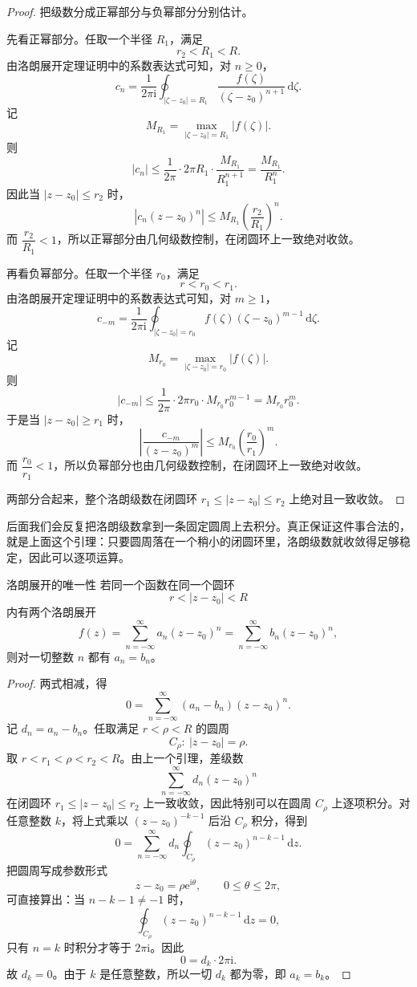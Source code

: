 \begin{proof}
把级数分成正幂部分与负幂部分分别估计。

先看正幂部分。任取一个半径 $R_1$，满足
\[
    r_2<R_1<R.
\]
由洛朗展开定理证明中的系数表达式可知，对 $n\ge 0$，
\[
    c_n=
    \frac{1}{2\pi\mathrm{i}}
    \oint_{|\zeta-z_0|=R_1}
    \frac{f(\zeta)}{(\zeta-z_0)^{n+1}}\,\mathrm{d}\zeta.
\]
记
\[
    M_{R_1}=\max_{|\zeta-z_0|=R_1}|f(\zeta)|.
\]
则
\[
    |c_n|
    \le \frac{1}{2\pi}\cdot 2\pi R_1\cdot \frac{M_{R_1}}{R_1^{n+1}}
    = \frac{M_{R_1}}{R_1^n}.
\]
因此当 $|z-z_0|\le r_2$ 时，
\[
    |c_n(z-z_0)^n|
    \le M_{R_1}\left(\frac{r_2}{R_1}\right)^n.
\]
而 $\dfrac{r_2}{R_1}<1$，所以正幂部分由几何级数控制，在闭圆环上一致绝对收敛。

再看负幂部分。任取一个半径 $r_0$，满足
\[
    r<r_0<r_1.
\]
由洛朗展开定理证明中的系数表达式可知，对 $m\ge 1$，
\[
    c_{-m}
    =
    \frac{1}{2\pi\mathrm{i}}
    \oint_{|\zeta-z_0|=r_0}
    f(\zeta)(\zeta-z_0)^{m-1}\,\mathrm{d}\zeta.
\]
记
\[
    M_{r_0}=\max_{|\zeta-z_0|=r_0}|f(\zeta)|.
\]
则
\[
    |c_{-m}|
    \le \frac{1}{2\pi}\cdot 2\pi r_0\cdot M_{r_0} r_0^{m-1}
    = M_{r_0}r_0^m.
\]
于是当 $|z-z_0|\ge r_1$ 时，
\[
    \left|\frac{c_{-m}}{(z-z_0)^m}\right|
    \le M_{r_0}\left(\frac{r_0}{r_1}\right)^m.
\]
而 $\dfrac{r_0}{r_1}<1$，所以负幂部分也由几何级数控制，在闭圆环上一致绝对收敛。

两部分合起来，整个洛朗级数在闭圆环 $r_1\le |z-z_0|\le r_2$ 上绝对且一致收敛。
\end{proof}

\begin{tishi}[为什么这个引理很值钱]
后面我们会反复把洛朗级数拿到一条固定圆周上去积分。真正保证这件事合法的，就是上面这个引理：只要圆周落在一个稍小的闭圆环里，洛朗级数就收敛得足够稳定，因此可以逐项运算。
\end{tishi}

\begin{dingli}{洛朗展开的唯一性}{}
若同一个函数在同一个圆环
\[
    r<|z-z_0|<R
\]
内有两个洛朗展开
\[
    f(z)=\sum_{n=-\infty}^{\infty} a_n (z-z_0)^n
    =\sum_{n=-\infty}^{\infty} b_n (z-z_0)^n,
\]
则对一切整数 $n$ 都有 $a_n=b_n$。
\end{dingli}

\begin{proof}
两式相减，得
\[
    0=\sum_{n=-\infty}^{\infty} (a_n-b_n)(z-z_0)^n.
\]
记 $d_n=a_n-b_n$。任取满足 $r<\rho<R$ 的圆周
\[
    C_\rho:\ |z-z_0|=\rho.
\]
取 $r<r_1<\rho<r_2<R$。由上一个引理，差级数
\[
    \sum_{n=-\infty}^{\infty} d_n (z-z_0)^n
\]
在闭圆环 $r_1\le |z-z_0|\le r_2$ 上一致收敛，因此特别可以在圆周 $C_\rho$ 上逐项积分。对任意整数 $k$，将上式乘以 $(z-z_0)^{-k-1}$ 后沿 $C_\rho$ 积分，得到
\[
    0=\sum_{n=-\infty}^{\infty} d_n
    \oint_{C_\rho}(z-z_0)^{n-k-1}\,\mathrm{d}z.
\]
把圆周写成参数形式
\[
    z-z_0=\rho \mathrm{e}^{\mathrm{i}\theta},\qquad 0\le \theta\le 2\pi,
\]
可直接算出：当 $n-k-1\ne -1$ 时，
\[
    \oint_{C_\rho}(z-z_0)^{n-k-1}\,\mathrm{d}z=0,
\]
只有 $n=k$ 时积分才等于 $2\pi \mathrm{i}$。因此
\[
    0=d_k\cdot 2\pi \mathrm{i}.
\]
故 $d_k=0$。由于 $k$ 是任意整数，所以一切 $d_k$ 都为零，即 $a_k=b_k$。
\end{proof}

